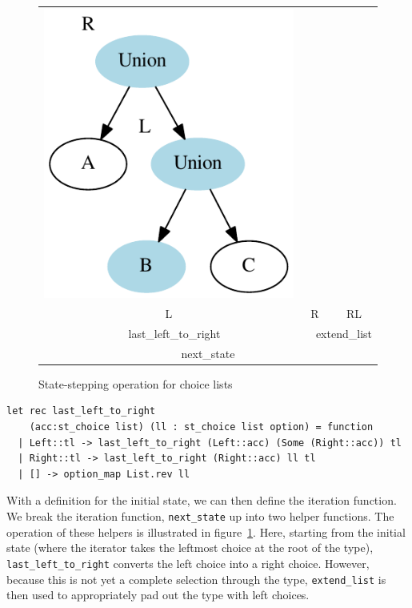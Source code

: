 \documentclass[a4paper,english]{lipics-v2018}
\begin{document}
\begin{figure}
\begin{tabular}{cccc}
\includegraphics[scale=0.6]{figures-gen/example3.pdf} \\
L & \multicolumn{2}{c}{R} & RL \\
\multicolumn{2}{c}{last\_left\_to\_right} & \multicolumn{2}{c}{extend\_list} \\
\hline
\multicolumn{4}{c}{next\_state} \\
\end{tabular}
\caption{State-stepping operation for choice lists}
\label{fig:sstep}
\end{figure}

\begin{verbatim}
let rec last_left_to_right 
    (acc:st_choice list) (ll : st_choice list option) = function
  | Left::tl -> last_left_to_right (Left::acc) (Some (Right::acc)) tl
  | Right::tl -> last_left_to_right (Right::acc) ll tl
  | [] -> option_map List.rev ll
\end{verbatim}

With a definition for the initial state, we can then define the iteration function.
We break the iteration function, \verb|next_state| up into two helper functions. The
operation of these helpers is illustrated in figure~\ref{fig:sstep}. Here, starting
from the initial state (where the iterator takes the leftmost choice at the root of
the type), \verb|last_left_to_right| converts the left choice into a right choice. However,
because this is not yet a complete selection through the type, \verb|extend_list| is then
used to appropriately pad out the type with left choices.
\end{document}
